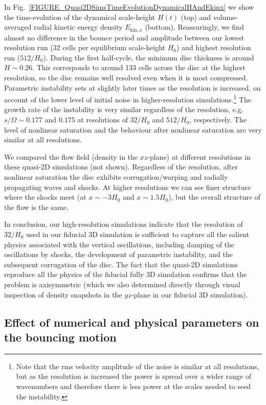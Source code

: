 \documentclass[fleqn,usenatbib]{mnras}
\begin{document}
In Fig.~\ref{FIGURE_Quasi2DSimsTimeEvolutionDynamicalHAndEkinx} we show the time-evolution of the dynamical scale-height $H(t)$ (top) and volume-averaged radial kinetic energy density $E_{\text{kin},x}$ (bottom). Reassuringly, we find almost no difference in the bounce period and amplitude between our lowest resolution run (32 cells per equilibrium scale-height $H_0$) and highest resolution run ($512/H_0$). During the first half-cycle, the minimum disc thickness is around $H \sim 0.26$. This corresponds to around 133 cells across the disc at the highest resolution, so the disc remains well resolved even when it is most compressed. Parametric instability sets at slightly later times as the resolution is increased, on account of the lower level of initial noise in higher-resolution simulations.\footnote{Note that the rms velocity amplitude of the noise is similar at all resolutions, but as the resolution is increased the power is spread over a wider range of wavenumbers and therefore there is less power at the scales needed to seed the instability.}  The growth rate of the instability is very similar regardless of the resolution, e.g. $s/\Omega \sim 0.177$ and $0.175$ at resolutions of $32/H_0$ and $512/H_0$, respectively. The level of nonlinear saturation and the behaviour after nonlinear saturation are very similar at all resolutions.


We compared the flow field (density in the $xz$-plane) at different resolutions in these quasi-2D simulations (not shown). Regardless of the resolution, after nonlinear saturation the disc exhibits corrugation/warping and radially propagating waves and shocks. At higher resolutions we can see finer structure where the shocks meet (at $x \sim -3H_0$ and  $x \sim 1.5H_0$), but the overall structure of the flow is the same.

In conclusion, our high-resolution simulations indicate that the resolution of $32/H_0$ used in our fiducial 3D simulation is sufficient to capture all the salient physics associated with the vertical oscillations, including damping of the oscillations by shocks, the development of parametric instability, and the subsequent corrugation of the disc. The fact that the quasi-2D simulations reproduce all the physics of the fiducial fully 3D simulation confirms that the problem is axisymmetric (which we also determined directly through visual inspection of density snapshots in the $yz$-plane in our fiducial 3D simulation).

\subsection{Effect of numerical and physical parameters on the bouncing motion}
\label{SECTION_FreeBounceParameterStudy}
\end{document}
